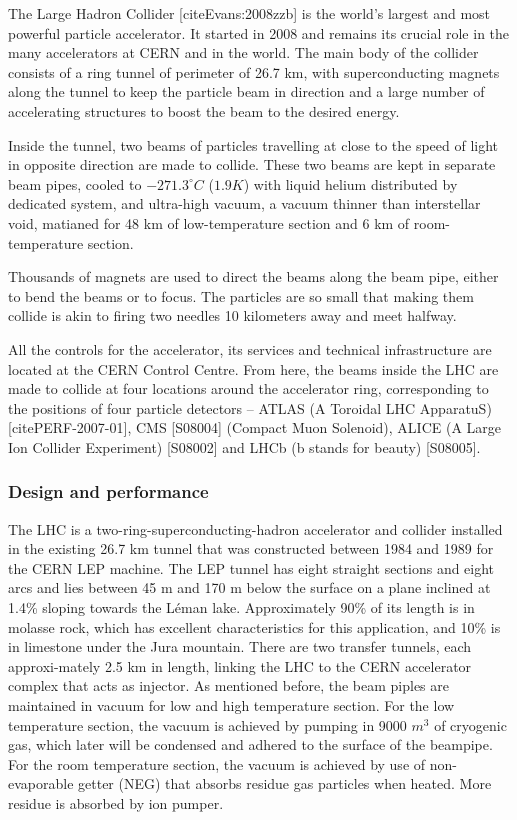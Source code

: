 \documentclass[letterpaper,12pt]{article}
\begin{document}
The Large Hadron Collider [cite{Evans:2008zzb}] is the world's largest and most powerful particle accelerator. 
It started in 2008 and remains its crucial role in the many accelerators at CERN and in the world.
The main body of the collider consists of a ring tunnel of perimeter of 26.7 km, with 
superconducting magnets along the tunnel to keep the particle beam in direction
 and a large number of accelerating structures to boost the beam to the desired energy.

Inside the tunnel, two beams of particles travelling at close to the speed of light 
in opposite direction are made to collide. These two beams are kept in separate beam pipes,
cooled to $-271.3^\circ C$ ($1.9K$) with liquid helium distributed by dedicated system, 
 and ultra-high vacuum, a vacuum thinner than 
interstellar void, matianed for 48 km of low-temperature section and 6 km of room-temperature 
section. 

Thousands of magnets are used to direct the beams along the beam pipe, either to bend the beams or
to focus. The particles are so small that making them collide is akin to 
firing two needles 10 kilometers away and meet halfway. 

All the controls for the accelerator, its services and technical infrastructure 
are located at the CERN Control Centre. 
From here, the beams inside the LHC are made to collide at four locations around the accelerator ring, 
corresponding to the positions of four particle detectors – ATLAS (A Toroidal LHC ApparatuS) [cite{PERF-2007-01}], 
CMS [S08004] (Compact Muon Solenoid), ALICE (A Large Ion Collider Experiment) [S08002] 
and LHCb (b stands for beauty) [S08005].


	\subsubsection{Design and performance}

	The LHC is a two-ring-superconducting-hadron accelerator and collider
	installed in the existing 26.7 km tunnel that was constructed between 1984 and 1989 
	for the CERN LEP machine. The LEP tunnel has eight straight sections and eight arcs 
	and lies between 45 m and 170 m below the surface on a plane inclined at 1.4\% sloping towards the Léman lake.
	Approximately 90\% of its length is in molasse rock, which has excellent characteristics for this application,
	and 10\% is in limestone under the Jura mountain. There are two transfer tunnels, 
	each approxi-mately 2.5 km in length, linking the LHC to the CERN accelerator complex that acts as injector.
	As mentioned before, the beam piples are maintained in vacuum for low and high temperature section.
	For the low temperature section, the vacuum is achieved by pumping in 9000 $m^3$ of cryogenic
	gas, which later will be condensed and adhered to the surface of the beampipe. For the room temperature
	section, the vacuum is achieved by use of non-evaporable getter (NEG) that absorbs residue gas particles 
	when heated. More residue is absorbed by ion pumper. 
\end{document}
